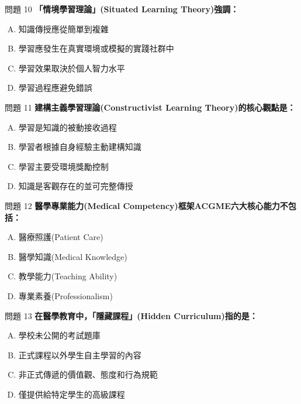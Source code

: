 \documentclass[aspectratio=169]{beamer}
\begin{document}
\begin{frame}{問題 10}
  \textbf{「情境學習理論」(Situated Learning Theory)強調：}
  \begin{enumerate}[A.]
    \item 知識傳授應從簡單到複雜
    \item 學習應發生在真實環境或模擬的實踐社群中
    \item 學習效果取決於個人智力水平
    \item 學習過程應避免錯誤
  \end{enumerate}
\end{frame}

\begin{frame}{問題 11}
  \textbf{建構主義學習理論(Constructivist Learning Theory)的核心觀點是：}
  \begin{enumerate}[A.]
    \item 學習是知識的被動接收過程
    \item 學習者根據自身經驗主動建構知識
    \item 學習主要受環境獎勵控制
    \item 知識是客觀存在的並可完整傳授
  \end{enumerate}
\end{frame}

\begin{frame}{問題 12}
  \textbf{醫學專業能力(Medical Competency)框架ACGME六大核心能力不包括：}
  \begin{enumerate}[A.]
    \item 醫療照護(Patient Care)
    \item 醫學知識(Medical Knowledge)
    \item 教學能力(Teaching Ability)
    \item 專業素養(Professionalism)
  \end{enumerate}
\end{frame}

\begin{frame}{問題 13}
  \textbf{在醫學教育中，「隱藏課程」(Hidden Curriculum)指的是：}
  \begin{enumerate}[A.]
    \item 學校未公開的考試題庫
    \item 正式課程以外學生自主學習的內容
    \item 非正式傳遞的價值觀、態度和行為規範
    \item 僅提供給特定學生的高級課程
  \end{enumerate}
\end{frame}
\end{document}
